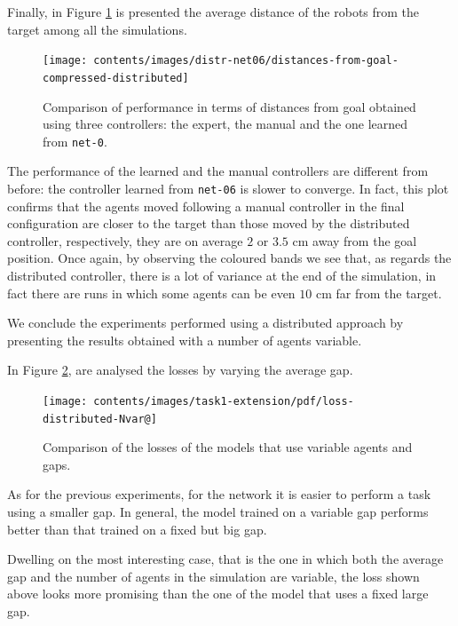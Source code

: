 Finally, in Figure \ref{fig:net06distance} is presented the average distance of 
the robots from the target among all the simulations. 
\begin{figure}[!htb]
	\centering
	\texttt{[image: contents/images/distr-net06/distances-from-goal-compressed-distributed]}%
	\caption[Evaluation of \texttt{net-06} distances from goal.]{Comparison 
	of performance in terms of distances from goal obtained using three 
	controllers: the expert, the manual and the one learned from \texttt{net-0}.}
	\label{fig:net06distance}
\end{figure}
The performance of the learned and the manual controllers are different from 
before: the controller learned from \texttt{net-06} is slower to converge. In 
fact, this plot confirms that the agents moved following a manual controller 
in the final configuration are closer to the target than those moved by the 
distributed controller, respectively, they are on average $2$ or $3.5$ \gls{cm} 
away from the goal position.
Once again, by observing the coloured bands we see that, as regards the 
distributed controller, there is a lot of variance at the end of the simulation, in fact 
there are runs in which some agents can be even $10$ \gls{cm} far from the 
target.

We conclude the experiments performed using a distributed approach by 
presenting the results obtained with a number of agents variable. 

In Figure \ref{fig:distlossnvar}, are analysed the losses by varying the average 
gap. 
\begin{figure}[!htb]
	\centering
	\texttt{[image: contents/images/task1-extension/pdf/loss-distributed-Nvar@]}%
	\caption{Comparison of the losses of the models that use variable agents 
	and 
		gaps.}
	\label{fig:distlossnvar}
\end{figure}
As for the previous experiments, for the network it is easier to perform a 
task using a smaller gap. In general, the model trained on a variable gap performs
better than that trained on a fixed but big gap.

Dwelling on the most interesting case, that is the one in which both the 
average gap and the number of agents in the simulation are variable, the loss 
shown above looks more promising than the one of the model that uses a 
fixed large gap. 

